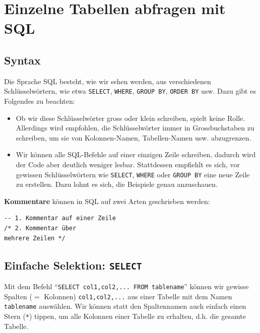 \section{Einzelne Tabellen abfragen mit \texorpdfstring{\gls{SQL}}{SQL}}

\lstset{style=sql}

\subsection{Syntax}
Die Sprache \acrfull{SQL} besteht, wie wir sehen werden, aus verschiedenen Schlüsselwörtern, wie etwa \lstinline|SELECT|, \lstinline|WHERE|, \lstinline|GROUP BY|, \lstinline|ORDER BY| usw. Dazu gibt es Folgendes zu beachten:
\begin{itemize}
  \item Ob wir diese Schlüsselwörter gross oder klein schreiben, spielt keine Rolle. Allerdings wird empfohlen, die Schlüsselwörter immer in Grossbuchstaben zu schreiben, um sie von Kolonnen-Namen, Tabellen-Namen usw. abzugrenzen.
  \item Wir können alle \gls{SQL}-Befehle auf einer einzigen Zeile schreiben, dadurch wird der Code aber deutlich weniger lesbar. Stattdessen empfiehlt es sich, vor gewissen Schlüsselwörtern wie \lstinline|SELECT|, \lstinline|WHERE| oder \lstinline|GROUP BY| eine neue Zeile zu erstellen. Dazu lohnt es sich, die Beispiele genau anzuschauen.
\end{itemize}

\textbf{Kommentare} können in \gls{SQL}  auf zwei Arten geschrieben werden:

\begin{lstlisting}
-- 1. Kommentar auf einer Zeile
/* 2. Kommentar über
mehrere Zeilen */
\end{lstlisting}

\subsection{Einfache Selektion: \texorpdfstring{\lstinline|SELECT|}{SELECT}}

Mit dem Befehl \enquote{\lstinline|SELECT col1,col2,... FROM tablename|} können wir gewisse Spalten ($=$ Kolonnen) \lstinline|col1,col2,...| aus einer Tabelle mit dem Namen \lstinline|tablename| auswählen. Wir können statt den Spaltennamen auch einfach einen Stern (\texttt{*}) tippen, um alle Kolonnen einer Tabelle zu erhalten, d.h. die gesamte Tabelle.


